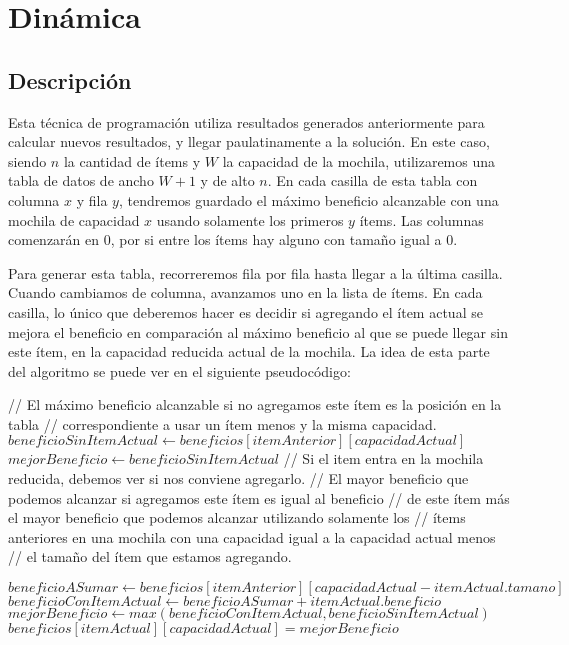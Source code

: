 \documentclass[10pt, a4paper]{article}
\begin{document}
\section{Dinámica}
\subsection{Descripción}
Esta técnica de programación utiliza resultados generados anteriormente para calcular nuevos resultados, y llegar paulatinamente a la solución. En este caso, siendo $n$ la cantidad de ítems y $W$ la capacidad de la mochila, utilizaremos una tabla de datos de ancho $W + 1$ y de alto $n$. En cada casilla de esta tabla con columna $x$ y fila $y$, tendremos guardado el máximo beneficio alcanzable con una mochila de capacidad $x$ usando solamente los primeros $y$ ítems. Las columnas comenzarán en 0, por si entre los ítems hay alguno con tamaño igual a 0.\par
Para generar esta tabla, recorreremos fila por fila hasta llegar a la última casilla. Cuando cambiamos de columna, avanzamos uno en la lista de ítems. En cada casilla, lo único que deberemos hacer es decidir si agregando el ítem actual se mejora el beneficio en comparación al máximo beneficio al que se puede llegar sin este ítem, en la capacidad reducida actual de la mochila. La idea de esta parte del algoritmo se puede ver en el siguiente pseudocódigo:\par
\begin{algorithmic}[1]
\State // El máximo beneficio alcanzable si no agregamos este ítem es la posición en la tabla
\State // correspondiente a usar un ítem menos y la misma capacidad.
\State $beneficioSinItemActual \gets beneficios[itemAnterior][capacidadActual]$
\State $mejorBeneficio \gets beneficioSinItemActual$
	\State // Si el item entra en la mochila reducida, debemos ver si nos conviene agregarlo.
	\State // El mayor beneficio que podemos alcanzar si agregamos este ítem es igual al beneficio
	\State // de este ítem más el mayor beneficio que podemos alcanzar utilizando solamente los
	\State // ítems anteriores en una mochila con una capacidad igual a la capacidad actual menos
	\State // el tamaño del ítem que estamos agregando.

	\State $beneficioASumar \gets beneficios[itemAnterior][capacidadActual - itemActual.tamano]$
	\State $beneficioConItemActual \gets beneficioASumar + itemActual.beneficio$
	\State $mejorBeneficio \gets max(beneficioConItemActual, beneficioSinItemActual)$
\EndIf
\State $beneficios[itemActual][capacidadActual] = mejorBeneficio$
\end{algorithmic}
\end{document}
